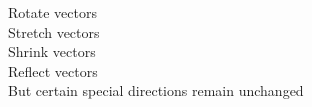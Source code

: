 \documentclass{article}
\begin{document}
Rotate vectors\\Stretch vectors\\Shrink vectors\\Reflect vectors\\But certain special directions remain unchanged\\
\end{document}
